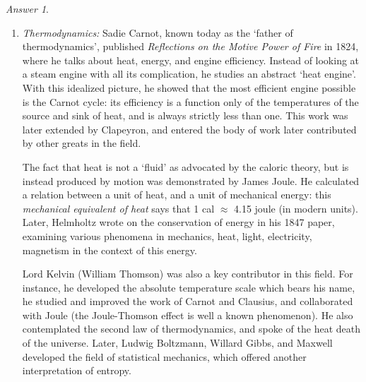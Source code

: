 \documentclass[11pt]{article}
\theoremstyle{remark}
\newtheorem*{answer}{Answer}
\begin{document}
\begin{answer}
\begin{enumerate}
            \item \textit{Thermodynamics:} Sadie Carnot, known today as the `father of
            thermodynamics', published \textit{Reflections on the Motive Power of
            Fire} in 1824, where he talks about heat, energy, and engine efficiency.
            Instead of looking at a steam engine with all its complication, he
            studies an abstract `heat engine'. With this idealized picture, he showed
            that the most efficient engine possible is the Carnot cycle: its
            efficiency is a function only of the temperatures of the source and sink
            of heat, and is always strictly less than one. This work was later
            extended by Clapeyron, and entered the body of work later contributed by
            other greats in the field.

            The fact that heat is not a `fluid' as advocated by the caloric theory,
            but is instead produced by motion was demonstrated by James Joule. He
            calculated a relation between a unit of heat, and a unit of mechanical
            energy: this \emph{mechanical equivalent of heat} says that 1 cal
            $\approx$ 4.15 joule (in modern units). Later, Helmholtz wrote on the
            conservation of energy in his 1847 paper, examining various phenomena in
            mechanics, heat, light, electricity, magnetism in the context of this
            energy.

            Lord Kelvin (William Thomson) was also a key contributor in this field.
            For instance, he developed the absolute temperature scale which bears his
            name, he studied and improved the work of Carnot and Clausius, and
            collaborated with Joule (the Joule-Thomson effect is well a known
            phenomenon). He also contemplated the second law of thermodynamics, and
            spoke of the heat death of the universe. Later, Ludwig Boltzmann, Willard
            Gibbs, and Maxwell developed the field of statistical mechanics, which
            offered another interpretation of entropy.


\end{enumerate}
\end{answer}
\end{document}
